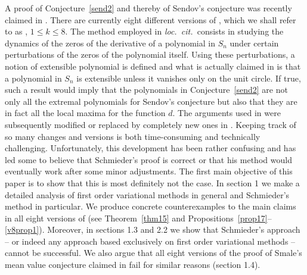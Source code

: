 \documentclass[10pt,twoside,a4paper,reqno]{amsart}
\theoremstyle{plain}
\theoremstyle{definition}
\begin{document}
{A proof of Conjecture~\ref{send2} and thereby of Sendov's conjecture was 
recently claimed in \cite{S1}. There are currently eight different versions 
of \cite{S1}, which we shall refer to as \cite[v$k$]{S1}, $1\le k\le 8$. 
The method employed in {\em loc.~cit.~}consists in studying 
the dynamics of the zeros of the derivative of a polynomial in $S_{n}$ under 
certain perturbations of the zeros of the polynomial itself. Using these 
perturbations, a notion of extensible polynomial is defined and what is 
actually claimed in \cite[v1-v2]{S1} is that a polynomial in $S_{n}$ is 
extensible unless it vanishes only on the unit circle. If true, such a result 
would imply that the polynomials in Conjecture~\ref{send2} are not only all 
the extremal polynomials for Sendov's conjecture but also that they are in 
fact all the local maxima for the function $d$. The arguments used in 
\cite[v1-v2]{S1} were subsequently modified or
replaced by completely new ones in \cite[v3-v8]{S1}. Keeping 
track of so many changes and versions is both time-consuming and 
technically challenging. Unfortunately, this development has been rather 
confusing and has led some to believe that Schmieder's proof is correct or 
that his method would eventually work after some minor adjustments. The first 
main objective of this paper is to show that this is most definitely not the 
case. In section 1 we make a detailed analysis of first order variational 
methods in general and Schmieder's method in particular. We produce concrete
counterexamples to the main claims in all eight versions of \cite{S1} (see 
Theorem~\ref{thm15} and Propositions~\ref{prop17}--\ref{v8prop1}). Moreover, 
in sections 1.3 and 2.2 we show that 
Schmieder's approach -- or indeed any approach based exclusively on first 
order variational methods -- cannot be successful. We also argue that all 
eight versions of the proof of Smale's mean value conjecture claimed in 
\cite{S2} fail for similar reasons (section 1.4).

}
\end{document}
